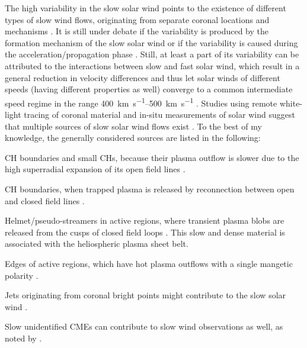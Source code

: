 The high variability in the slow solar wind points to the existence of different types of slow wind flows, originating from separate coronal locations and mechanisms \citep{Schwenn1983}. It is still under debate if the variability is produced by the formation mechanism of the slow solar wind or if the variability is caused during the acceleration/propagation phase \citep{Sanchez-Diaz2016}. Still, at least a part of its variability can be attributed to the interactions between slow and fast solar wind, which result in a general reduction in velocity differences and thus let solar winds of different speeds (having different properties as well) converge to a common intermediate speed regime in the range \SIrange{400}{500}{\km\per\s} \citep{McGregor2011a,Sanchez-Diaz2016}. Studies using remote white-light tracing of coronal material and in-situ measurements of solar wind suggest that multiple sources of slow solar wind flows exist \citep{Wang2000,Kilpua2016}. To the best of my knowledge, the generally considered sources are listed in the following:
\begin{itemize*}
	\item CH boundaries and small CHs, because their plasma outflow is slower due to the high superradial expansion of its open field lines \citep{Wang1990}.
	\item CH boundaries, when trapped plasma is released by reconnection between open and closed field lines \citep{Madjarska2004}.
	\item Helmet/pseudo-streamers in active regions, where transient plasma blobs are released from the cusps of closed field loops \citep{Wang1998,Wang2000}. This slow and dense material is associated with the heliospheric plasma sheet belt.
	\item Edges of active regions, which have hot plasma outflows with a single mangetic polarity \citep{Kojima1999}.
	\item Jets originating from coronal bright points might contribute to the slow solar wind \citep{Subramanian2010}.
	\item Slow unidentified CMEs can contribute to slow wind observations as well, as noted by \citet{Wang2000}.
\end{itemize*}

